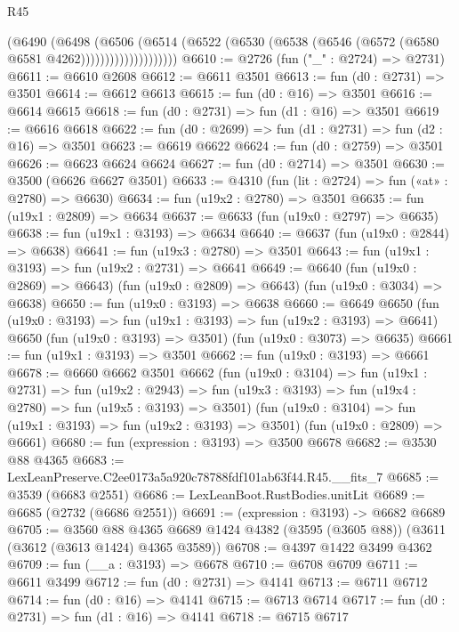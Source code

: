 \begin{lexlean}{R45}
\begin{coremodule}
                        (@6490
                          (@6498
                            (@6506
                              (@6514
                                (@6522
                                  (@6530 (@6538 (@6546 (@6572 (@6580 @6581 @4262))))))))))))))))))))
@6610 := @2726 (fun ("_" : @2724) => @2731)
@6611 := @6610 @2608
@6612 := @6611 @3501
@6613 := fun (d0 : @2731) => @3501
@6614 := @6612 @6613
@6615 := fun (d0 : @16) => @3501
@6616 := @6614 @6615
@6618 := fun (d0 : @2731) => fun (d1 : @16) => @3501
@6619 := @6616 @6618
@6622 := fun (d0 : @2699) => fun (d1 : @2731) => fun (d2 : @16) => @3501
@6623 := @6619 @6622
@6624 := fun (d0 : @2759) => @3501
@6626 := @6623 @6624 @6624
@6627 := fun (d0 : @2714) => @3501
@6630 := @3500 (@6626 @6627 @3501)
@6633 := @4310 (fun (lit : @2724) => fun («at» : @2780) => @6630)
@6634 := fun (u19x2 : @2780) => @3501
@6635 := fun (u19x1 : @2809) => @6634
@6637 := @6633 (fun (u19x0 : @2797) => @6635)
@6638 := fun (u19x1 : @3193) => @6634
@6640 := @6637 (fun (u19x0 : @2844) => @6638)
@6641 := fun (u19x3 : @2780) => @3501
@6643 := fun (u19x1 : @3193) => fun (u19x2 : @2731) => @6641
@6649 := @6640
    (fun (u19x0 : @2869) => @6643)
    (fun (u19x0 : @2809) => @6643)
    (fun (u19x0 : @3034) => @6638)
@6650 := fun (u19x0 : @3193) => @6638
@6660 := @6649
    @6650
    (fun (u19x0 : @3193) => fun (u19x1 : @3193) => fun (u19x2 : @3193) => @6641)
    @6650
    (fun (u19x0 : @3193) => @3501)
    (fun (u19x0 : @3073) => @6635)
@6661 := fun (u19x1 : @3193) => @3501
@6662 := fun (u19x0 : @3193) => @6661
@6678 := @6660
    @6662
    @3501
    @6662
    (fun (u19x0 : @3104) =>
    fun (u19x1 : @2731) =>
    fun (u19x2 : @2943) =>
    fun (u19x3 : @3193) => fun (u19x4 : @2780) => fun (u19x5 : @3193) => @3501)
    (fun (u19x0 : @3104) => fun (u19x1 : @3193) => fun (u19x2 : @3193) => @3501)
    (fun (u19x0 : @2809) => @6661)
@6680 := fun (expression : @3193) => @3500 @6678
@6682 := @3530 @88 @4365
@6683 := LexLeanPreserve.C2ee0173a5a920c78788fdf101ab63f44.R45.__fits_7
@6685 := @3539 (@6683 @2551)
@6686 := LexLeanBoot.RustBodies.unitLit
@6689 := @6685 (@2732 (@6686 @2551))
@6691 := (expression : @3193) -> @6682 @6689
@6705 := @3560
    @88
    @4365
    @6689
    @1424
    @4382
    (@3595 (@3605 @88))
    (@3611 (@3612 (@3613 @1424) @4365 @3589))
@6708 := @4397 @1422 @3499 @4362
@6709 := fun (__a : @3193) => @6678
@6710 := @6708 @6709
@6711 := @6611 @3499
@6712 := fun (d0 : @2731) => @4141
@6713 := @6711 @6712
@6714 := fun (d0 : @16) => @4141
@6715 := @6713 @6714
@6717 := fun (d0 : @2731) => fun (d1 : @16) => @4141
@6718 := @6715 @6717

\end{coremodule}
\end{lexlean}
